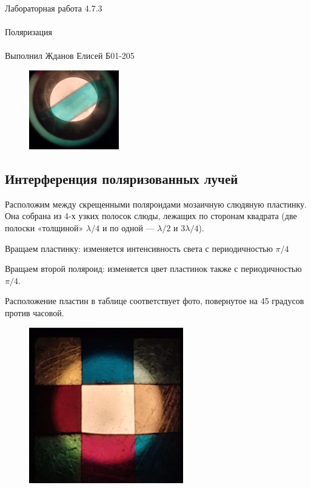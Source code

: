 \documentclass{astroedu-lab}
\begin{document}
\begin{problem}{\huge Лабораторная работа 4.7.3\\\\Поляризация\\\\Выполнил Жданов Елисей Б01-205}
\begin{figure}[!h]
	\centering
	\includegraphics[width=0.35\textwidth]{photo/photo_2024-04-26_17-42-09.jpg}
	\label{fig:boiler}
\end{figure}

\subsection{Интерференция поляризованных лучей}

Расположим между скрещенными поляроидами мозаичную слюдяную пластинку. Она собрана из 4-х узких полосок слюды, лежащих по сторонам квадрата (две полоски «толщиной» $\lambda/4$ и по одной — $\lambda/2$ и $3\lambda/4$).
\par Вращаем пластинку: изменяется интенсивность света с периодичностью $\pi/4$
\par Вращаем второй поляроид: изменяется цвет пластинок также с периодичностью  $\pi/4$.

Расположение пластин в таблице соответствует фото, повернутое на 45 градусов против часовой.

\newpage

\begin{figure}[!h]
	\centering
	\includegraphics[width=0.6\textwidth]{photo/photo_2024-04-26_17-42-04.jpg}
	\label{fig:boiler}
\end{figure}


\end{problem}
\end{document}
